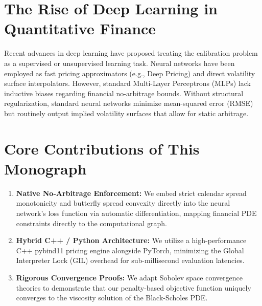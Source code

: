 \section{The Rise of Deep Learning in Quantitative Finance}
Recent advances in deep learning have proposed treating the calibration problem as a supervised or unsupervised learning task. Neural networks have been employed as fast pricing approximators (e.g., Deep Pricing) and direct volatility surface interpolators. However, standard Multi-Layer Perceptrons (MLPs) lack inductive biases regarding financial no-arbitrage bounds. Without structural regularization, standard neural networks minimize mean-squared error (RMSE) but routinely output implied volatility surfaces that allow for static arbitrage.

\section{Core Contributions of This Monograph}
\begin{enumerate}
    \item \textbf{Native No-Arbitrage Enforcement:} We embed strict calendar spread monotonicity and butterfly spread convexity directly into the neural network's loss function via automatic differentiation, mapping financial PDE constraints directly to the computational graph.
    \item \textbf{Hybrid C++ / Python Architecture:} We utilize a high-performance C++ pybind11 pricing engine alongside PyTorch, minimizing the Global Interpreter Lock (GIL) overhead for sub-millisecond evaluation latencies.
    \item \textbf{Rigorous Convergence Proofs:} We adapt Sobolev space convergence theories to demonstrate that our penalty-based objective function uniquely converges to the viscosity solution of the Black-Scholes PDE.
\end{enumerate}

